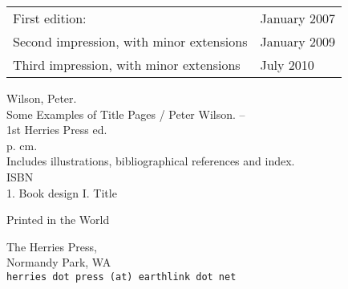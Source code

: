 \begin{center}
	\begin{tabular}{ll}
		First edition:  & January 2007 \\
		Second impression, with minor extensions & January 2009 \\
		Third impression, with minor extensions & July 2010 
	\end{tabular}
\end{center}

\vfill

Wilson, Peter.\\
\hspace*{2em} Some Examples of Title Pages / Peter Wilson. -- \\
\hspace*{1em} 1st Herries Press ed. \\
\hspace*{2em} p. \hspace*{2em} cm. \\
\hspace*{2em} Includes illustrations, bibliographical references and index. \\
\hspace*{2em} ISBN \\
\hspace*{2em} 1. Book design \hspace*{2em} I. Title


\vfill

Printed in the World

The Herries Press, \\
Normandy Park, WA \\
\texttt{herries dot press (at) earthlink dot net}

\vspace*{2\baselineskip}


\endgroup
\clearpage
\pagestyle{plain}